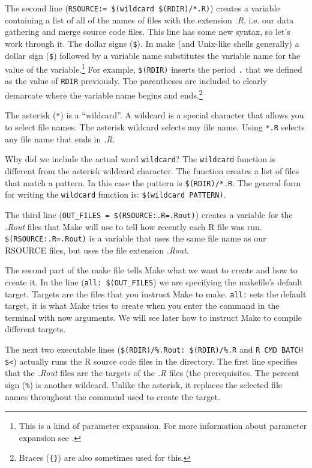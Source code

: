 The second line (\verb|RSOURCE:= $(wildcard $(RDIR)/*.R)|) creates a variable containing a list of all of the names of files with the extension \emph{.R}, i.e. our data gathering and merge source code files. This line has some new syntax, so let's work through it. The dollar signs (\verb|$|). In make (and Unix-like shells generally) a dollar sign (\verb|$|) followed by a variable name substitutes the variable name for the value of the variable.\footnote{This is a kind of parameter expansion. For more information about parameter expansion see \citep{Frazier2008}.} For example, \verb|$(RDIR)| inserts the period \texttt{.} that we defined as the value of \texttt{RDIR} previously. The parentheses are included to clearly demarcate where the variable name begins and ends.\footnote{Braces (\texttt{\{\}}) are also sometimes used for this.} 

The asterisk (\verb|*|) is a ``wildcard''. A wildcard is a special character that allows you to select file names. The asterisk wildcard selects any file name. Using \verb|*.R| selects any file name that ends in \emph{.R}.  

Why did we include the actual word \texttt{wildcard}? The \texttt{wildcard} function is different from the asterisk wildcard character. The function creates a list of files that match a pattern. In this case the pattern is \verb|$(RDIR)/*.R|. The general form for writing the \texttt{wildcard} function is: \verb|$(wildcard PATTERN)|.

The third line (\verb|OUT_FILES = $(RSOURCE:.R=.Rout)|) creates a variable for the \emph{.Rout} files that Make will use to tell how recently each R file was run. \verb|$(RSOURCE:.R=.Rout)| is a variable that uses the same file name as our RSOURCE files, but uses the file extension \emph{.Rout}.

The second part of the make file tells Make what we want to create and how to create it. In the line (\verb|all: $(OUT_FILES|) we are specifying the makefile's default target. Targets are the files that you instruct Make to make. \texttt{all:} sets the default target, it is what Make tries to create when you enter the command  in the terminal with now arguments. We will see later how to instruct Make to compile different targets.

The next two executable lines (\verb|$(RDIR)/%.Rout: $(RDIR)/%.R| and \verb|R CMD BATCH $<|) actually runs the R source code files in the directory.  The first line specifies that the \emph{.Rout} files are the targets of the \emph{.R} files (the prerequisites. The percent sign (\verb|%|) is another wildcard. Unlike the asterisk, it replaces the selected file names throughout the command used to create the target.


